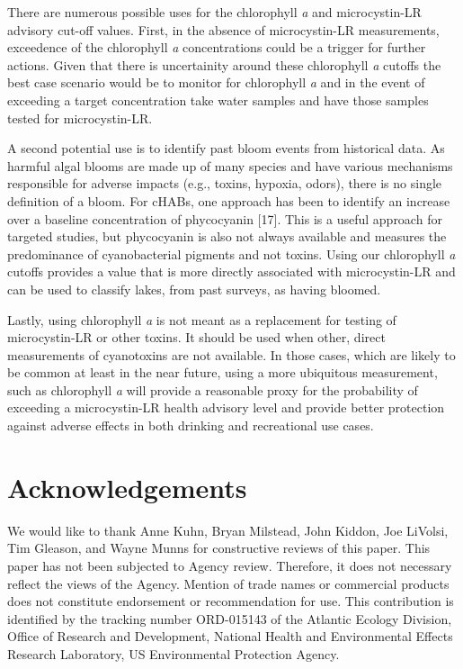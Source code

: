 \documentclass[11pt,]{article}
\begin{document}
There are numerous possible uses for the chlorophyll \emph{a} and
microcystin-LR advisory cut-off values. First, in the absence of
microcystin-LR measurements, exceedence of the chlorophyll \emph{a}
concentrations could be a trigger for further actions. Given that there
is uncertainity around these chlorophyll \emph{a} cutoffs the best case
scenario would be to monitor for chlorophyll \emph{a} and in the event
of exceeding a target concentration take water samples and have those
samples tested for microcystin-LR.

A second potential use is to identify past bloom events from historical
data. As harmful algal blooms are made up of many species and have
various mechanisms responsible for adverse impacts (e.g., toxins,
hypoxia, odors), there is no single definition of a bloom. For cHABs,
one approach has been to identify an increase over a baseline
concentration of phycocyanin {[}17{]}. This is a useful approach for
targeted studies, but phycocyanin is also not always available and
measures the predominance of cyanobacterial pigments and not toxins.
Using our chlorophyll \emph{a} cutoffs provides a value that is more
directly associated with microcystin-LR and can be used to classify
lakes, from past surveys, as having bloomed.

Lastly, using chlorophyll \emph{a} is not meant as a replacement for
testing of microcystin-LR or other toxins. It should be used when other,
direct measurements of cyanotoxins are not available. In those cases,
which are likely to be common at least in the near future, using a more
ubiquitous measurement, such as chlorophyll \emph{a} will provide a
reasonable proxy for the probability of exceeding a microcystin-LR
health advisory level and provide better protection against adverse
effects in both drinking and recreational use cases.

\section{Acknowledgements}\label{acknowledgements}

We would like to thank Anne Kuhn, Bryan Milstead, John Kiddon, Joe
LiVolsi, Tim Gleason, and Wayne Munns for constructive reviews of this
paper. This paper has not been subjected to Agency review. Therefore, it
does not necessary reflect the views of the Agency. Mention of trade
names or commercial products does not constitute endorsement or
recommendation for use. This contribution is identified by the tracking
number ORD-015143 of the Atlantic Ecology Division, Office of Research
and Development, National Health and Environmental Effects Research
Laboratory, US Environmental Protection Agency.
\end{document}
